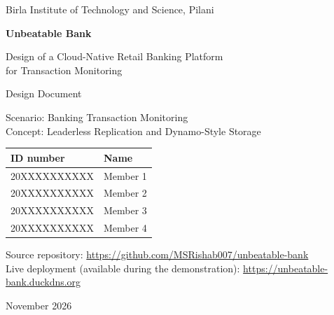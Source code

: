 \documentclass[11pt,a4paper]{article}
\newcommand{\project}{Unbeatable Bank}
\newcommand{\repourl}{\url{https://github.com/MSRishab007/unbeatable-bank}}
\newcommand{\liveurl}{\url{https://unbeatable-bank.duckdns.org}}
\begin{document}
\begin{titlepage}
\centering
{\large Birla Institute of Technology and Science, Pilani\par}
\vspace{2.5cm}
{\Huge\bfseries \project{}\par}
\vspace{0.4cm}
{\Large Design of a Cloud-Native Retail Banking Platform\\for Transaction Monitoring\par}
\vspace{0.6cm}
{\large Design Document\par}
\vspace{1.5cm}
{\normalsize Scenario: Banking Transaction Monitoring\\Concept: Leaderless Replication and Dynamo-Style Storage\par}
\vspace{2cm}
\begin{tabular}{ll}
\toprule
\textbf{ID number} & \textbf{Name} \\
\midrule
20XXXXXXXXXX & Member 1 \\
20XXXXXXXXXX & Member 2 \\
20XXXXXXXXXX & Member 3 \\
20XXXXXXXXXX & Member 4 \\
\bottomrule
\end{tabular}
\vfill
{\small Source repository: \repourl\\[2pt]
Live deployment (available during the demonstration): \liveurl\par}
\vspace{0.5cm}
{\small November 2026\par}
\end{titlepage}
\end{document}
